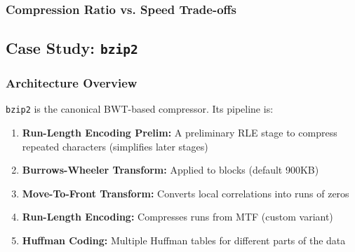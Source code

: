 \subsubsection{Compression Ratio vs. Speed Trade-offs}

\begin{center}
\end{center}

\subsection{Case Study: \texttt{bzip2}}

\subsubsection{Architecture Overview}

\texttt{bzip2} is the canonical BWT-based compressor. Its pipeline is:

\begin{enumerate}
    \item \textbf{Run-Length Encoding Prelim:} A preliminary RLE stage to compress repeated characters (simplifies later stages)
    \item \textbf{Burrows-Wheeler Transform:} Applied to blocks (default 900KB)
    \item \textbf{Move-To-Front Transform:} Converts local correlations into runs of zeros
    \item \textbf{Run-Length Encoding:} Compresses runs from MTF (custom variant)
    \item \textbf{Huffman Coding:} Multiple Huffman tables for different parts of the data
\end{enumerate}

